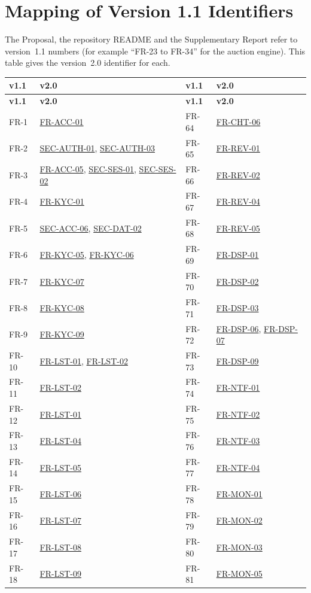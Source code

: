 \documentclass[11pt,a4paper]{report}
\newcommand{\rr}[1]{\hyperlink{#1}{#1}}
\begin{document}
\chapter{Mapping of Version 1.1 Identifiers}
\label{app:map}
The Proposal, the repository README and the Supplementary Report refer to version~1.1 numbers (for example ``FR-23 to FR-34'' for the auction engine). This table gives the version~2.0 identifier for each.
{\small\begin{longtable}{@{}l >{\raggedright\arraybackslash}p{4.6cm} @{\hspace{1.2cm}} l >{\raggedright\arraybackslash}p{4.6cm}@{}}
\toprule \textbf{v1.1} & \textbf{v2.0} & \textbf{v1.1} & \textbf{v2.0} \\ \midrule\endfirsthead
\toprule \textbf{v1.1} & \textbf{v2.0} & \textbf{v1.1} & \textbf{v2.0} \\ \midrule\endhead \bottomrule\endfoot
FR-1 & \rr{FR-ACC-01} & FR-64 & \rr{FR-CHT-06} \\
FR-2 & \rr{SEC-AUTH-01}, \rr{SEC-AUTH-03} & FR-65 & \rr{FR-REV-01} \\
FR-3 & \rr{FR-ACC-05}, \rr{SEC-SES-01}, \rr{SEC-SES-02} & FR-66 & \rr{FR-REV-02} \\
FR-4 & \rr{FR-KYC-01} & FR-67 & \rr{FR-REV-04} \\
FR-5 & \rr{SEC-ACC-06}, \rr{SEC-DAT-02} & FR-68 & \rr{FR-REV-05} \\
FR-6 & \rr{FR-KYC-05}, \rr{FR-KYC-06} & FR-69 & \rr{FR-DSP-01} \\
FR-7 & \rr{FR-KYC-07} & FR-70 & \rr{FR-DSP-02} \\
FR-8 & \rr{FR-KYC-08} & FR-71 & \rr{FR-DSP-03} \\
FR-9 & \rr{FR-KYC-09} & FR-72 & \rr{FR-DSP-06}, \rr{FR-DSP-07} \\
FR-10 & \rr{FR-LST-01}, \rr{FR-LST-02} & FR-73 & \rr{FR-DSP-09} \\
FR-11 & \rr{FR-LST-02} & FR-74 & \rr{FR-NTF-01} \\
FR-12 & \rr{FR-LST-01} & FR-75 & \rr{FR-NTF-02} \\
FR-13 & \rr{FR-LST-04} & FR-76 & \rr{FR-NTF-03} \\
FR-14 & \rr{FR-LST-05} & FR-77 & \rr{FR-NTF-04} \\
FR-15 & \rr{FR-LST-06} & FR-78 & \rr{FR-MON-01} \\
FR-16 & \rr{FR-LST-07} & FR-79 & \rr{FR-MON-02} \\
FR-17 & \rr{FR-LST-08} & FR-80 & \rr{FR-MON-03} \\
FR-18 & \rr{FR-LST-09} & FR-81 & \rr{FR-MON-05} \\

\end{longtable}}
\end{document}
